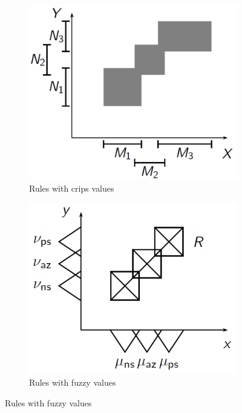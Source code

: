 \documentclass{article}
\begin{document}
\begin{figure}[H]
    \centering
    \hfill
    \begin{subfigure}[b]{0.4\textwidth}
        \centering
        \includegraphics[scale=0.3]{images/crisp-rules.png}
        \caption{Rules with crips values}
        \label{fig:crisp}
    \end{subfigure}
    \hfill
    \begin{subfigure}[b]{0.4\textwidth}
        \centering
        \includegraphics[scale=0.3]{images/fuzzy-rules.png}
        \caption{Rules with fuzzy values}
        \label{fig:fuz-val}
    \end{subfigure}
    \hfill
\end{figure}
\end{document}
